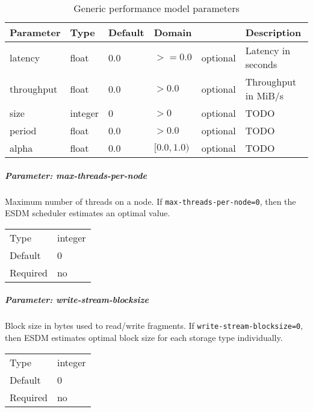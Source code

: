 \begin{preserve}
\begin{table}[!ht]
  \begin{center}
    \begin{tabularx}{\textwidth}{lllllX}
      Parameter  & Type    & Default & Domain      &          & Description         \\ 
      \hline
      latency    & float   & 0.0     & $>=0.0$     & optional & Latency in seconds  \\ 
      throughput & float   & 0.0     & $>0.0$      & optional & Throughput in MiB/s \\ 
      size       & integer & 0       & $>0$        & optional & TODO                \\ 
      period     & float   & 0.0     & $>0.0$      & optional & TODO                \\ 
      alpha      & float   & 0.0     & $[0.0,1.0)$ & optional & TODO                \\ 
    \end{tabularx}
  \end{center}
  \caption{Generic performance model parameters}%
  \label{tab:gen_perf_model_conf_params}
\end{table}
\end{preserve}

\FloatBarrier
\vspace{\gapsize}


\subparagraph{Parameter: max-threads-per-node}
Maximum number of threads on a node.
If \lstinline|max-threads-per-node=0|, then the ESDM scheduler estimates an optimal value.

\begin{preserve}
  \noindent
  \begin{tabular}{ll}
    Type     & integer \\ 
    Default  & 0       \\ 
    Required & no      \\ 
  \end{tabular}
\end{preserve}
\FloatBarrier
\vspace{\gapsize}

\subparagraph{Parameter: write-stream-blocksize}
Block size in bytes used to read/write fragments.
If \lstinline|write-stream-blocksize=0|, then ESDM estimates optimal block size for each storage type individually.

\begin{preserve}
  \noindent
  \begin{tabular}{ll}
    Type     & integer \\ 
    Default  & 0       \\ 
    Required & no      \\ 
  \end{tabular}
\end{preserve}
\FloatBarrier
\vspace{\gapsize}

